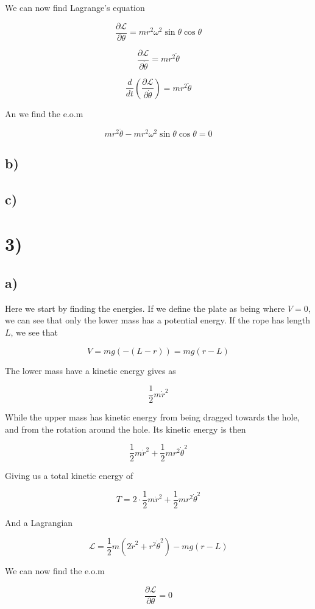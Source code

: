 \documentclass[a4paper,norsk, 10pt]{article}
\begin{document}
We can now find Lagrange's equation

$$
\frac{\partial \mathcal{L}}{\partial \theta} = mr^2\omega^2 \sin\theta \cos\theta
$$

$$
\frac{\partial \mathcal{L}}{\partial \dot{\theta}} = mr^2\dot{\theta}
$$

$$
\frac{d}{dt}\left( \frac{\partial \mathcal{L}}{\partial \dot{\theta}} \right) = mr^2\ddot{\theta}
$$

An we find the e.o.m

$$
mr^2\ddot{\theta} - mr^2\omega^2 \sin\theta \cos\theta = 0
$$

\subsection*{b)}

\subsection*{c)}


\section*{3)}
\subsection*{a)}
Here we start by finding the energies. If we define the plate as being where $V = 0$, we can see that only the lower mass has a potential energy. If the rope has length $L$, we see that

$$
V = mg(-(L-r)) = mg(r-L)
$$

The lower mass have a kinetic energy gives as 

$$
\frac{1}{2}m\dot{r}^2
$$

While the upper mass has kinetic energy from being dragged towards the hole, and from the rotation around the hole. Its kinetic energy is then

$$
\frac{1}{2}m\dot{r}^2 + \frac{1}{2}mr^2\dot{\theta}^2
$$

Giving us a total kinetic energy of

$$
T = 2\cdot\frac{1}{2}m\dot{r}^2 + \frac{1}{2}mr^2\dot{\theta}^2 
$$

And a Lagrangian

$$
\mathcal{L} = \frac{1}{2}m(2\dot{r}^2 +r^2\dot{\theta}^2) - mg(r-L)
$$

We can now find the e.o.m

\begin{equation}
\frac{\partial \mathcal{L}}{\partial \theta} = 0
\label{eq:partialtheta}
\end{equation}
\end{document}
